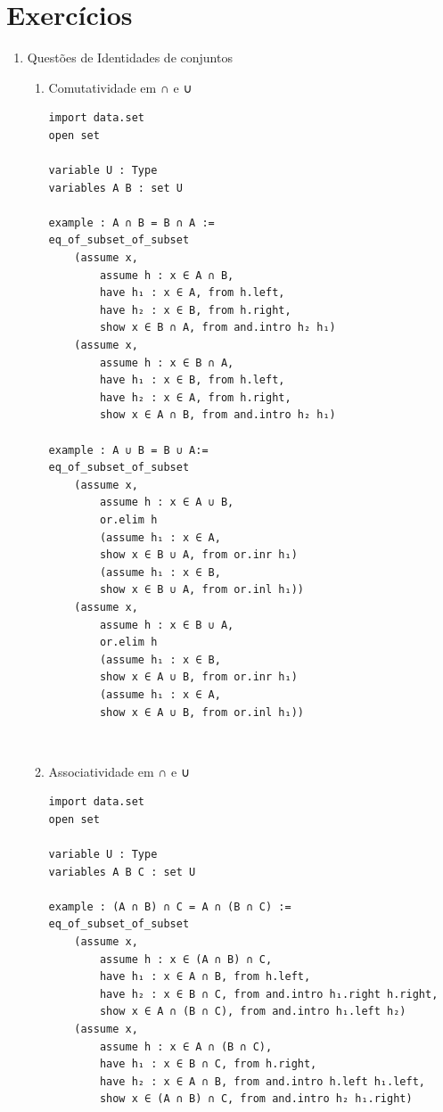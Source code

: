 \section{Exercícios}
\begin{enumerate}
    
\item Questões de Identidades de conjuntos

\begin{enumerate}

\item Comutatividade em ∩ e ∪ 
\begin{lstlisting}
import data.set
open set

variable U : Type
variables A B : set U
 
example : A ∩ B = B ∩ A := 
eq_of_subset_of_subset
    (assume x,
        assume h : x ∈ A ∩ B,
        have h₁ : x ∈ A, from h.left,
        have h₂ : x ∈ B, from h.right,
        show x ∈ B ∩ A, from and.intro h₂ h₁)
    (assume x,
        assume h : x ∈ B ∩ A,
        have h₁ : x ∈ B, from h.left,
        have h₂ : x ∈ A, from h.right,
        show x ∈ A ∩ B, from and.intro h₂ h₁)

example : A ∪ B = B ∪ A:=
eq_of_subset_of_subset
    (assume x,
        assume h : x ∈ A ∪ B,
        or.elim h
        (assume h₁ : x ∈ A,
        show x ∈ B ∪ A, from or.inr h₁)
        (assume h₁ : x ∈ B,
        show x ∈ B ∪ A, from or.inl h₁))
    (assume x,
        assume h : x ∈ B ∪ A,
        or.elim h
        (assume h₁ : x ∈ B,
        show x ∈ A ∪ B, from or.inr h₁)
        (assume h₁ : x ∈ A,
        show x ∈ A ∪ B, from or.inl h₁)) \end{lstlisting}

$\qquad$
\item Associatividade em ∩ e ∪ 
\begin{lstlisting}
import data.set
open set

variable U : Type
variables A B C : set U
 
example : (A ∩ B) ∩ C = A ∩ (B ∩ C) :=
eq_of_subset_of_subset
    (assume x,
        assume h : x ∈ (A ∩ B) ∩ C,
        have h₁ : x ∈ A ∩ B, from h.left,
        have h₂ : x ∈ B ∩ C, from and.intro h₁.right h.right,
        show x ∈ A ∩ (B ∩ C), from and.intro h₁.left h₂) 
    (assume x,
        assume h : x ∈ A ∩ (B ∩ C),
        have h₁ : x ∈ B ∩ C, from h.right,
        have h₂ : x ∈ A ∩ B, from and.intro h.left h₁.left,
        show x ∈ (A ∩ B) ∩ C, from and.intro h₂ h₁.right) 


\end{lstlisting}
\end{enumerate}
\end{enumerate}

